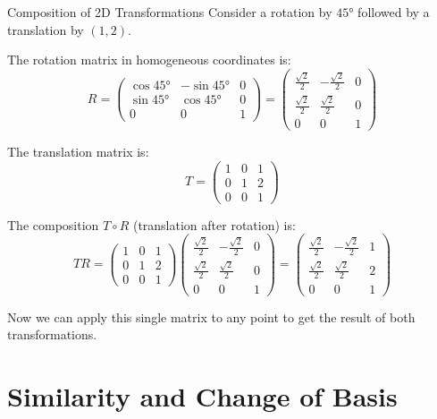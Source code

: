 \documentclass[12pt,a4paper]{article}
\begin{document}
	\begin{example}{Composition of 2D Transformations}
		Consider a rotation by $45°$ followed by a translation by $(1, 2)$.
		
		The rotation matrix in homogeneous coordinates is:
		\[
		R = \begin{pmatrix} \cos 45° & -\sin 45° & 0 \\ \sin 45° & \cos 45° & 0 \\ 0 & 0 & 1 \end{pmatrix} = \begin{pmatrix} \frac{\sqrt{2}}{2} & -\frac{\sqrt{2}}{2} & 0 \\ \frac{\sqrt{2}}{2} & \frac{\sqrt{2}}{2} & 0 \\ 0 & 0 & 1 \end{pmatrix}
		\]
		
		The translation matrix is:
		\[
		T = \begin{pmatrix} 1 & 0 & 1 \\ 0 & 1 & 2 \\ 0 & 0 & 1 \end{pmatrix}
		\]
		
		The composition $T \circ R$ (translation after rotation) is:
		\[
		TR = \begin{pmatrix} 1 & 0 & 1 \\ 0 & 1 & 2 \\ 0 & 0 & 1 \end{pmatrix} \begin{pmatrix} \frac{\sqrt{2}}{2} & -\frac{\sqrt{2}}{2} & 0 \\ \frac{\sqrt{2}}{2} & \frac{\sqrt{2}}{2} & 0 \\ 0 & 0 & 1 \end{pmatrix} = \begin{pmatrix} \frac{\sqrt{2}}{2} & -\frac{\sqrt{2}}{2} & 1 \\ \frac{\sqrt{2}}{2} & \frac{\sqrt{2}}{2} & 2 \\ 0 & 0 & 1 \end{pmatrix}
		\]
		
		Now we can apply this single matrix to any point to get the result of both transformations.
	\end{example}
	
	\newpage
	
	\section{Similarity and Change of Basis}
	
\end{document}
